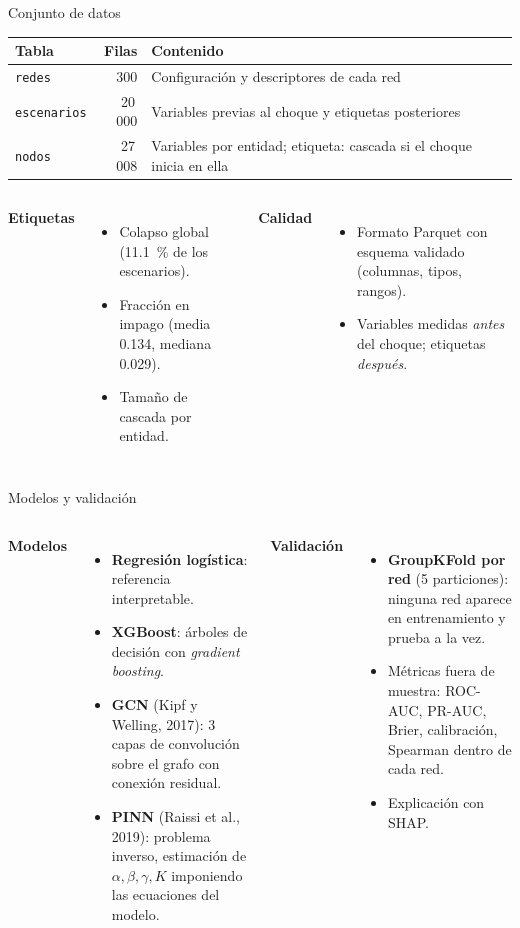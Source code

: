\documentclass[aspectratio=169,10pt]{beamer}
\begin{document}
\begin{frame}{Conjunto de datos}
\small
\begin{tabular}{lrp{}}
\toprule
Tabla & Filas & Contenido \\
\midrule
\texttt{redes} & 300 & Configuración y descriptores de cada red \\
\texttt{escenarios} & 20\,000 & Variables previas al choque y etiquetas posteriores \\
\texttt{nodos} & 27\,008 & Variables por entidad; etiqueta: cascada si el choque inicia en ella \\
\bottomrule
\end{tabular}
\vspace{0.3cm}

\begin{columns}[T]
\textbf{Etiquetas}
\begin{itemize}
\item Colapso global (11.1~\% de los escenarios).
\item Fracción en impago (media 0.134, mediana 0.029).
\item Tamaño de cascada por entidad.
\end{itemize}
\textbf{Calidad}
\begin{itemize}
\item Formato Parquet con esquema validado (columnas, tipos, rangos).
\item Variables medidas \emph{antes} del choque; etiquetas \emph{después}.
\end{itemize}
\end{columns}
\end{frame}

\begin{frame}{Modelos y validación}
\begin{columns}[T]
\textbf{Modelos}
\begin{itemize}
\item \textbf{Regresión logística}: referencia interpretable.
\item \textbf{XGBoost}: árboles de decisión con \emph{gradient boosting}.
\item \textbf{GCN} (Kipf y Welling, 2017): 3 capas de convolución sobre el grafo con
conexión residual.
\item \textbf{PINN} (Raissi et al., 2019): problema inverso, estimación de
$\alpha,\beta,\gamma,K$ imponiendo las ecuaciones del modelo.
\end{itemize}
\textbf{Validación}
\begin{itemize}
\item \textbf{GroupKFold por red} (5 particiones): ninguna red aparece en entrenamiento
y prueba a la vez.
\item Métricas fuera de muestra: ROC-AUC, PR-AUC, Brier, calibración, Spearman dentro de
cada red.
\item Explicación con SHAP.
\end{itemize}
\end{columns}
\end{frame}
\end{document}
